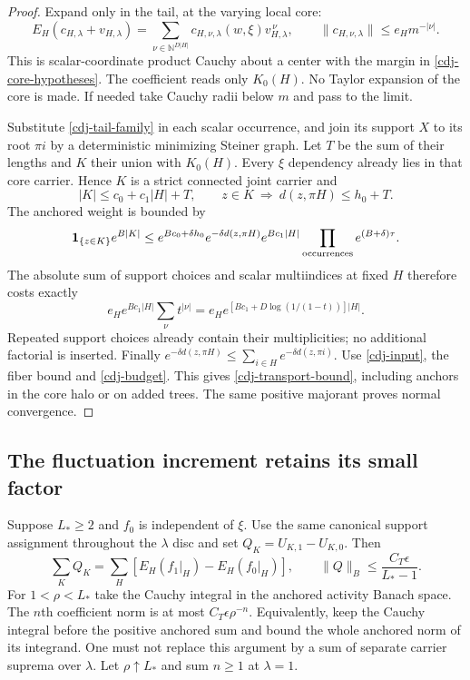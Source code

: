 \documentclass[11pt]{article}
\theoremstyle{remark}
\begin{document}
\begin{proof}
Expand only in the tail, at the varying local core:
\[
 E_H(c_{H,\lambda}+v_{H,\lambda})
  =\sum_{\nu\in\mathbb N^{D|H|}}
     c_{H,\nu,\lambda}(w,\xi)v_{H,\lambda}^{\,\nu},
 \qquad
 \|c_{H,\nu,\lambda}\|\le e_Hm^{-|\nu|}.
\]
This is scalar-coordinate product Cauchy about a center with
the margin in \eqref{cdj-core-hypotheses}. The coefficient reads
only $K_0(H)$. No Taylor expansion of the core is made.
If needed take Cauchy radii below $m$ and pass to the limit.

Substitute \eqref{cdj-tail-family} in each scalar occurrence,
and join its support $X$ to its root $\pi i$ by a deterministic
minimizing Steiner graph. Let $T$ be the sum of their lengths
and $K$ their union with $K_0(H)$. Every $\xi$ dependency
already lies in that core carrier. Hence $K$ is a strict
connected joint carrier and
\[
 |K|\le c_0+c_1|H|+T,\qquad
 z\in K\ \Longrightarrow\ d(z,\pi H)\le h_0+T.
\]
The anchored weight is bounded by
\[
 \mathbf1_{\{z\in K\}}e^{B|K|}
 \le e^{Bc_0+\delta h_0}e^{-\delta d(z,\pi H)}
      e^{Bc_1|H|}
      \prod_{\rm occurrences}e^{(B+\delta)\tau}.
\]
The absolute sum of support choices and scalar multiindices
at fixed $H$ therefore costs exactly
\[
 e_H e^{Bc_1|H|}\sum_\nu t^{|\nu|}
   =e_He^{[Bc_1+D\log(1/(1-t))]|H|}.
\]
Repeated support choices already contain their multiplicities;
no additional factorial is inserted. Finally
$e^{-\delta d(z,\pi H)}
\le\sum_{i\in H}e^{-\delta d(z,\pi i)}$.
Use \eqref{cdj-input}, the fiber bound and
\eqref{cdj-budget}. This gives \eqref{cdj-transport-bound},
including anchors in the core halo or on added trees.
The same positive majorant proves normal convergence.
\end{proof}

\subsection{The fluctuation increment retains its small factor}
\label{cdj-increment-section}

Suppose $L_*\ge2$ and $f_0$ is independent of $\xi$. Use the
same canonical support assignment throughout the $\lambda$ disc
and set $Q_K=U_{K,1}-U_{K,0}$. Then
\begin{equation}\label{cdj-Cauchy-increment}
 \sum_KQ_K=\sum_H[E_H(f_1|_H)-E_H(f_0|_H)],
 \qquad
 \|Q\|_B\le \frac{C_T\epsilon}{L_*-1}.
\end{equation}
For $1<\rho<L_*$ take the Cauchy integral in the anchored
activity Banach space. The $n$th coefficient norm is at most
$C_T\epsilon\rho^{-n}$. Equivalently, keep the Cauchy integral
before the positive anchored sum and bound the whole anchored
norm of its integrand. One must not replace this argument
by a sum of separate carrier suprema over $\lambda$.
Let $\rho\uparrow L_*$ and sum $n\ge1$ at $\lambda=1$.
\end{document}
